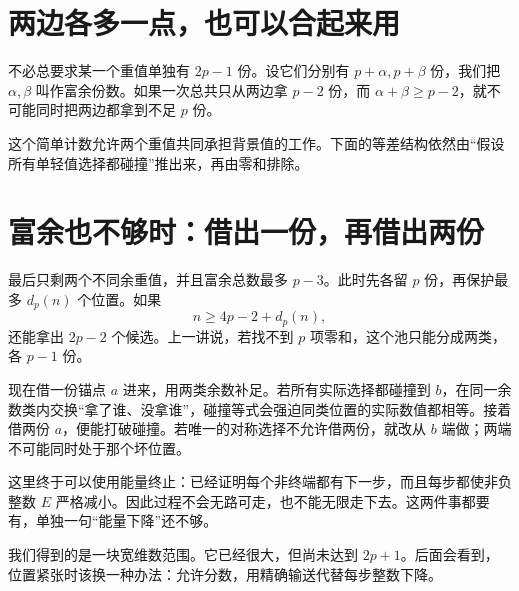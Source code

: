 \section{两边各多一点，也可以合起来用}
不必总要求某一个重值单独有 $2p-1$ 份。设它们分别有 $p+\alpha,p+\beta$ 份，我们把 $\alpha,\beta$ 叫作富余份数。如果一次总共只从两边拿 $p-2$ 份，而 $\alpha+\beta\ge p-2$，就不可能同时把两边都拿到不足 $p$ 份。

这个简单计数允许两个重值共同承担背景值的工作。下面的等差结构依然由“假设所有单轻值选择都碰撞”推出来，再由零和排除。

\section{富余也不够时：借出一份，再借出两份}
最后只剩两个不同余重值，并且富余总数最多 $p-3$。此时先各留 $p$ 份，再保护最多 $d_p(n)$ 个位置。如果
\[n\ge4p-2+d_p(n),
\]
还能拿出 $2p-2$ 个候选。上一讲说，若找不到 $p$ 项零和，这个池只能分成两类，各 $p-1$ 份。

现在借一份锚点 $a$ 进来，用两类余数补足。若所有实际选择都碰撞到 $b$，在同一余数类内交换“拿了谁、没拿谁”，碰撞等式会强迫同类位置的实际数值都相等。接着借两份 $a$，便能打破碰撞。若唯一的对称选择不允许借两份，就改从 $b$ 端做；两端不可能同时处于那个坏位置。

这里终于可以使用能量终止：已经证明每个非终端都有下一步，而且每步都使非负整数 $E$ 严格减小。因此过程不会无路可走，也不能无限走下去。这两件事都要有，单独一句“能量下降”还不够。

我们得到的是一块宽维数范围。它已经很大，但尚未达到 $2p+1$。后面会看到，位置紧张时该换一种办法：允许分数，用精确输送代替每步整数下降。
